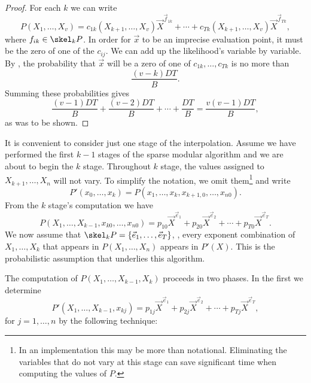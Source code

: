 \begin{proof}
For each $k$ we can write
\[
P(X_1, \ldots, X_v) = c_{1k}(X_{k+1}, \ldots, X_v) \vec{X}^{\vec{f}_{1k}}
+ \cdots +
c_{Tk}(X_{k+1}, \ldots, X_v) \vec{X}^{\vec{f}_{Tk}},
\]
where $f_{ik} \in \skel_k P$.  In order for $\vec{x}$ to be
an imprecise evaluation point, it must be the zero of one of the
$c_{ij}$.  We can add up the likelihood's variable by variable.  By
, the probability that $\vec{x}$ will be
a zero of one of $c_{1k}, \ldots, c_{Tk}$ is no more than
\[
\frac{(v-k)DT}{B}.
\]
Summing these probabilities gives
\[
\frac{(v-1)DT}{B} + \frac{(v-2)DT}{B} + \cdots + \frac{DT}{B} =
\frac{v(v-1)DT}{B},
\]
as was to be shown. 
\end{proof}

\medskip

It is convenient to consider just one stage of the interpolation.
Assume we have performed the first $k-1$ stages of the sparse modular
algorithm and we are about to begin the $k$\th{} stage.  Throughout
$k${\th} stage, the values assigned to $X_{k+1}, \ldots, X_{n}$ will
not vary.  To simplify the notation, we omit them\footnote{In an
implementation this may be more than notational.  Eliminating the
variables that do not vary at this stage can save significant time
when computing the values of $P$.} and write
\[
P'(x_0, \ldots, x_k) = P(x_1, \ldots, x_k, x_{k+1,0}, \ldots, x_{n0}).
\]
From the $k${\th} stage's computation we have
\[
P(X_1, \ldots, X_{k-1}, x_{k0}, \ldots, x_{n0}) = p_{10} {\vec X}^{\vec e_1} +
p_{20} {\vec X}^{\vec e_2} + \cdots + p_{T0} {\vec X}^{\vec e_T}.
\]
We now assume that $\skel_k P = \{\vec{e}_1, \ldots, \vec{e}_T\}$,
\ie, every exponent combination of $X_1, \ldots, X_k$ that appears in
$P(X_1, \ldots, X_n)$ appears in $P'(X)$.  This is the probabilistic
assumption that underlies this algorithm.

The computation of $P(X_1, \ldots, X_{k-1}, X_k)$ proceeds in two phases.
In the first we determine  
\[
P'(X_1, \ldots, X_{k-1}, x_{kj}) = 
p_{1j} {\vec X}^{\vec e_1} + p_{2j} {\vec X}^{\vec e_2} + \cdots + p_{Tj} {\vec
X}^{\vec e_T},
\]
for $j = 1, \ldots, n$ by the following technique:

